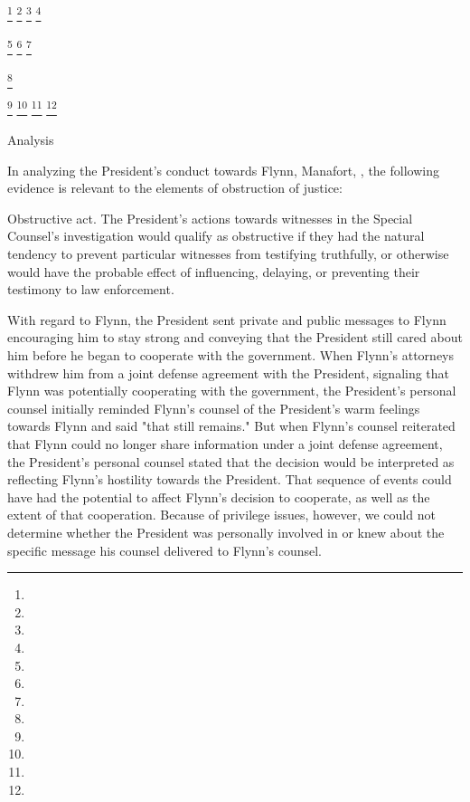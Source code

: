 {

\footnote{}
\footnote{}
\footnote{}
\footnote{}

\footnote{}
\footnote{}
\footnote{}

\footnote{}

\footnote{}
\footnote{}
\footnote{}
\footnote{}

Analysis

In analyzing the President's conduct towards Flynn, Manafort, , the following evidence is relevant to the elements of obstruction of justice:

Obstructive act.
The President's actions towards witnesses in the Special Counsel's investigation would qualify as obstructive if they had the natural tendency to prevent particular witnesses from testifying truthfully, or otherwise would have the probable effect of influencing, delaying, or preventing their testimony to law enforcement.

With regard to Flynn, the President sent private and public messages to Flynn encouraging him to stay strong and conveying that the President still cared about him before he began to cooperate with the government.
When Flynn's attorneys withdrew him from a joint defense agreement with the President, signaling that Flynn was potentially cooperating with the government, the President's personal counsel initially reminded Flynn's counsel of the President's warm feelings towards Flynn and said "that still remains."
But when Flynn's counsel reiterated that Flynn could no longer share information under a joint defense agreement, the President's personal counsel stated that the decision would be interpreted as reflecting Flynn's hostility towards the President.
That sequence of events could have had the potential to affect Flynn's decision to cooperate, as well as the extent of that cooperation.
Because of privilege issues, however, we could not determine whether the President was personally involved in or knew about the specific message his counsel delivered to Flynn's counsel.

}
